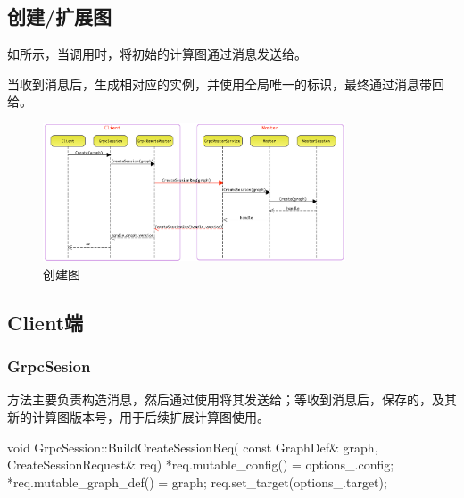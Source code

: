 \begin{content}
\begin{content}
\section{创建/扩展图}

\begin{content}

如所示，当调用时，将初始的计算图通过消息发送给。

当收到消息后，生成相对应的实例，并使用全局唯一的标识，最终通过消息带回给。

\begin{figure}[H]
\centering
\includegraphics[width=0.8\textwidth]{figures/dist-create-session.png}
\caption{创建图}
 \label{fig:dist-create-session}
\end{figure}

\subsection{Client端}

\subsubsection{GrpcSesion}

方法主要负责构造消息，然后通过使用将其发送给；等收到消息后，保存的，及其新的计算图版本号，用于后续扩展计算图使用。

\begin{leftbar}
\begin{c++}
void GrpcSession::BuildCreateSessionReq(
    const GraphDef& graph,
    CreateSessionRequest& req) {
  *req.mutable_config() = options_.config;
  *req.mutable_graph_def() = graph;
  req.set_target(options_.target);
}


\end{c++}
\end{leftbar}
\end{content}
\end{content}
\end{content}
